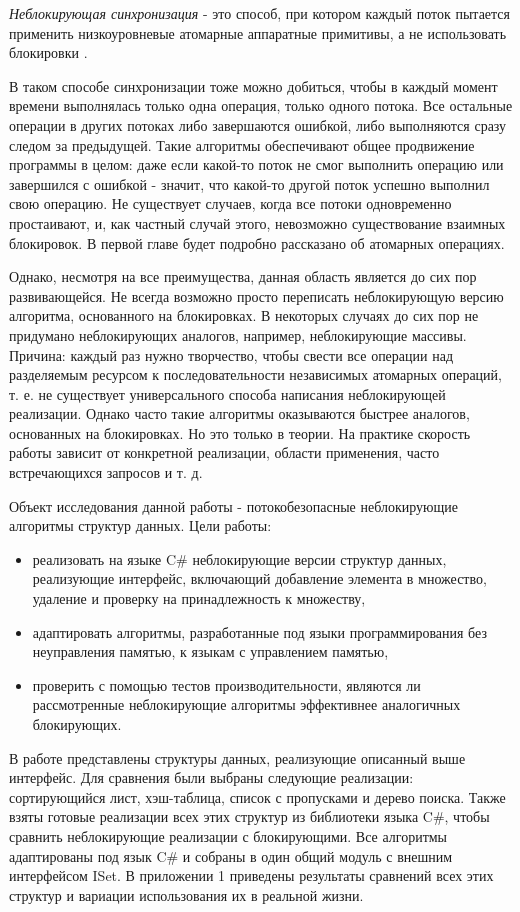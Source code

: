 \documentclass[12pt]{article}
\begin{document}
{			\par \textit{Неблокирующая синхронизация} - это способ, при котором каждый поток пытается применить низкоуровневые атомарные аппаратные примитивы, а не использовать блокировки \cite{introLockFree}. 
			\par В таком способе синхронизации тоже можно добиться, чтобы в каждый момент времени выполнялась только одна операция, только одного потока. Все остальные операции в других потоках либо завершаются ошибкой, либо выполняются сразу следом за предыдущей. Такие алгоритмы обеспечивают общее продвижение программы в целом: даже если какой-то поток не смог выполнить операцию или завершился с ошибкой - значит, что какой-то другой поток успешно выполнил свою операцию. Не существует случаев, когда все потоки одновременно простаивают, и, как частный случай этого, невозможно существование взаимных блокировок. В первой главе будет подробно рассказано об атомарных операциях. 
			\par Однако, несмотря на все преимущества, данная область является до сих пор развивающейся. Не всегда возможно просто переписать неблокирующую версию алгоритма, основанного на блокировках. В некоторых случаях до сих пор не придумано неблокирующих аналогов, например, неблокирующие массивы. Причина: каждый раз нужно творчество, чтобы свести все операции над разделяемым ресурсом к последовательности независимых атомарных операций, т. е. не существует универсального способа написания неблокирующей реализации. Однако часто такие алгоритмы оказываются быстрее аналогов, основанных на блокировках. Но это только в теории. На практике скорость работы зависит от конкретной реализации, области применения, часто встречающихся запросов и т. д.
			\par Объект исследования данной работы - потокобезопасные неблокирующие алгоритмы структур данных. Цели работы:
			\begin{itemize}
				\item реализовать на языке C\# неблокирующие версии структур данных, реализующие интерфейс, включающий добавление элемента в множество, удаление и проверку на принадлежность к множеству,
				\item адаптировать алгоритмы, разработанные под языки программирования без неуправления памятью, к языкам с управлением памятью,
				\item проверить с помощью тестов производительности, являются ли рассмотренные неблокирующие алгоритмы эффективнее аналогичных блокирующих.
			\end{itemize}
			\par В работе представлены структуры данных, реализующие описанный выше интерфейс. Для сравнения были выбраны следующие реализации: сортирующийся лист, хэш-таблица, список с пропусками и дерево поиска. Также взяты готовые реализации всех этих структур из библиотеки языка C\#, чтобы сравнить неблокирующие реализации с блокирующими. Все алгоритмы адаптированы под язык C\# и собраны в один общий модуль с внешним интерфейсом ISet. В приложении 1 приведены результаты сравнений всех этих структур и вариации использования их в реальной жизни.
		
}
\end{document}
